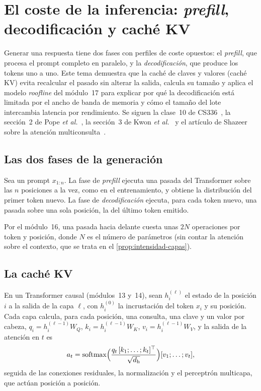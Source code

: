 \chapter{El coste de la inferencia: \emph{prefill}, decodificación y caché KV}
\label{tema:2}

Generar una respuesta tiene dos fases con perfiles de coste opuestos: el \emph{prefill}, que procesa el prompt completo en paralelo, y la \emph{decodificación}, que produce los tokens uno a uno. Este tema demuestra que la caché de claves y valores (caché KV) evita recalcular el pasado sin alterar la salida, calcula su tamaño y aplica el modelo \emph{roofline} del módulo~17 para explicar por qué la decodificación está limitada por el ancho de banda de memoria y cómo el tamaño del lote intercambia latencia por rendimiento. Se siguen la clase~10 de CS336~\cite{cs336}, la sección~2 de Pope \emph{et al.}~\cite{pope}, la sección~3 de Kwon \emph{et al.}~\cite{kwon} y el artículo de Shazeer sobre la atención multiconsulta~\cite{shazeer}.

\section{Las dos fases de la generación}

\begin{definicion}\label{def:fases}
Sea un prompt $x_{1:n}$. La fase de \emph{prefill} ejecuta una pasada del Transformer sobre las $n$ posiciones a la vez, como en el entrenamiento, y obtiene la distribución del primer token nuevo. La fase de \emph{decodificación} ejecuta, para cada token nuevo, una pasada sobre una sola posición, la del último token emitido.
\end{definicion}

Por el módulo~16, una pasada hacia delante cuesta unas $2N$ operaciones por token y posición, donde $N$ es el número de parámetros (sin contar la atención sobre el contexto, que se trata en el \cref{prop:intensidad-capas}).

\addtocounter{definicion}{1}%

\section{La caché KV}

En un Transformer causal (módulos~13 y~14), sean $h^{(\ell)}_i$ el estado de la posición $i$ a la salida de la capa $\ell$, con $h^{(0)}_i$ la incrustación del token $x_i$ y su posición. Cada capa calcula, para cada posición, una consulta, una clave y un valor por cabeza, $q_i=h^{(\ell-1)}_iW_Q$, $k_i=h^{(\ell-1)}_iW_K$, $v_i=h^{(\ell-1)}_iW_V$, y la salida de la atención en $t$ es
\[
a_t=\operatorname{softmax}\Bigl(\frac{q_t\,[k_1;\dots;k_t]^{\top}}{\sqrt{d_{\mathrm{h}}}}\Bigr)[v_1;\dots;v_t],
\]
seguida de las conexiones residuales, la normalización y el perceptrón multicapa, que actúan posición a posición.

